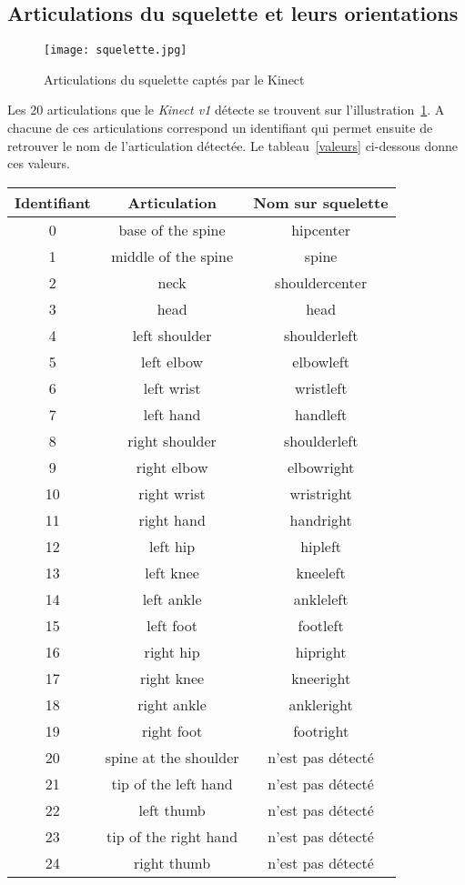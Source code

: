 \subsection{Articulations du squelette et leurs orientations} \label{articulation} 
\begin{figure}[h]
	\centering
		\texttt{[image: squelette.jpg]}
	\caption{\label{Joints} Articulations du squelette captés par le Kinect}
\end{figure}
Les 20 articulations que le \textit{Kinect v1} détecte se trouvent sur l'illustration~\ref{Joints}. A chacune de ces articulations correspond un identifiant qui permet ensuite de retrouver le nom de l'articulation détectée. Le tableau~\ref{valeurs} ci-dessous donne ces valeurs.
\begin{center}
	\begin{tabular}{| c | c | c |}
	\hline
		\textbf{Identifiant} & \textbf{Articulation} & \textbf{Nom sur squelette} \\ \hline
		0 & base of the spine & hipcenter \\ \hline
		1 & middle of the spine & spine \\ \hline
		2 & neck & shouldercenter \\ \hline
		3 & head & head \\ \hline
		4 & left shoulder & shoulderleft \\ \hline
		5 & left elbow & elbowleft \\ \hline
		6 & left wrist & wristleft \\ \hline
		7 & left hand & handleft \\ \hline
		8 & right shoulder & shoulderleft \\ \hline
		9 & right elbow & elbowright \\ \hline
		10 & right wrist & wristright \\ \hline
		11 & right hand & handright \\ \hline
		12 & left hip & hipleft \\ \hline
		13 & left knee & kneeleft \\ \hline
		14 & left ankle & ankleleft \\ \hline
		15 & left foot & footleft \\ \hline
		16 & right hip & hipright \\ \hline
		17 & right knee & kneeright \\ \hline
		18 & right ankle & ankleright \\ \hline
		19 & right foot & footright \\ \hline
		20 & spine at the shoulder & n'est pas détecté \\ \hline
		21 & tip of the left hand & n'est pas détecté \\ \hline
		22 & left thumb & n'est pas détecté \\ \hline
		23 & tip of the right hand & n'est pas détecté \\ \hline
		24 & right thumb & n'est pas détecté \\
		\hline
	\end{tabular}
\end{center}

